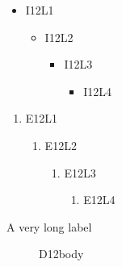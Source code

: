 \documentclass[12pt]{article}
\begin{document}
\begin{itemize}
\item I12L1
  \begin{itemize}
  \item I12L2
    \begin{itemize}
    \item I12L3
      \begin{itemize}
      \item I12L4
      \end{itemize}
    \end{itemize}
  \end{itemize}
\end{itemize}
\newpage
\begin{enumerate}
\item E12L1
  \begin{enumerate}
  \item E12L2
    \begin{enumerate}
    \item E12L3
      \begin{enumerate}
      \item E12L4
      \end{enumerate}
    \end{enumerate}
  \end{enumerate}
\end{enumerate}
\newpage
\begin{description}
\item[A very long label] D12body
\end{description}
\end{document}
